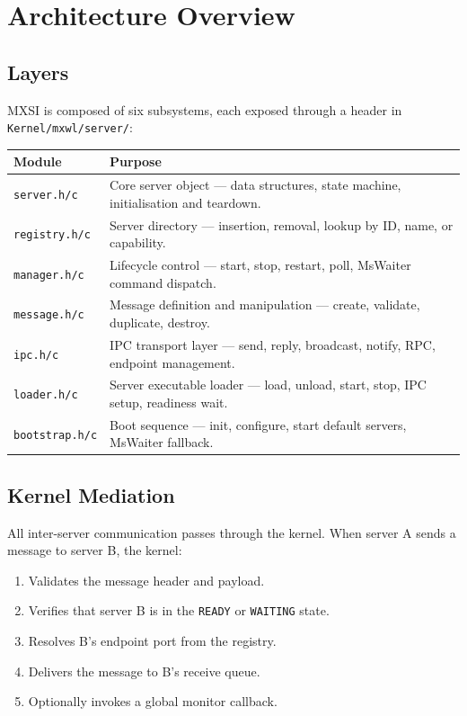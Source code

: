 \documentclass[a4paper,11pt]{article}
\begin{document}
\section{Architecture Overview}

\subsection{Layers}

MXSI is composed of six subsystems, each exposed through a header
in \texttt{Kernel/mxwl/server/}:

\begin{center}
\begin{tabularx}{\textwidth}{|l|X|}
\hline
\textbf{Module} & \textbf{Purpose} \\
\hline
\texttt{server.h/c}   & Core server object --- data structures,
                        state machine, initialisation and teardown. \\
\texttt{registry.h/c} & Server directory --- insertion, removal,
                        lookup by ID, name, or capability. \\
\texttt{manager.h/c}  & Lifecycle control --- start, stop,
                        restart, poll, MsWaiter command dispatch. \\
\texttt{message.h/c}  & Message definition and manipulation ---
                        create, validate, duplicate, destroy. \\
\texttt{ipc.h/c}      & IPC transport layer --- send, reply,
                        broadcast, notify, RPC, endpoint management. \\
\texttt{loader.h/c}   & Server executable loader --- load, unload,
                        start, stop, IPC setup, readiness wait. \\
\texttt{bootstrap.h/c}& Boot sequence --- init, configure, start
                        default servers, MsWaiter fallback. \\
\hline
\end{tabularx}
\end{center}

\subsection{Kernel Mediation}

All inter-server communication passes through the kernel. When server
A sends a message to server B, the kernel:

\begin{enumerate}
  \item Validates the message header and payload.
  \item Verifies that server B is in the \texttt{READY} or
    \texttt{WAITING} state.
  \item Resolves B's endpoint port from the registry.
  \item Delivers the message to B's receive queue.
  \item Optionally invokes a global monitor callback.
\end{enumerate}
\end{document}
